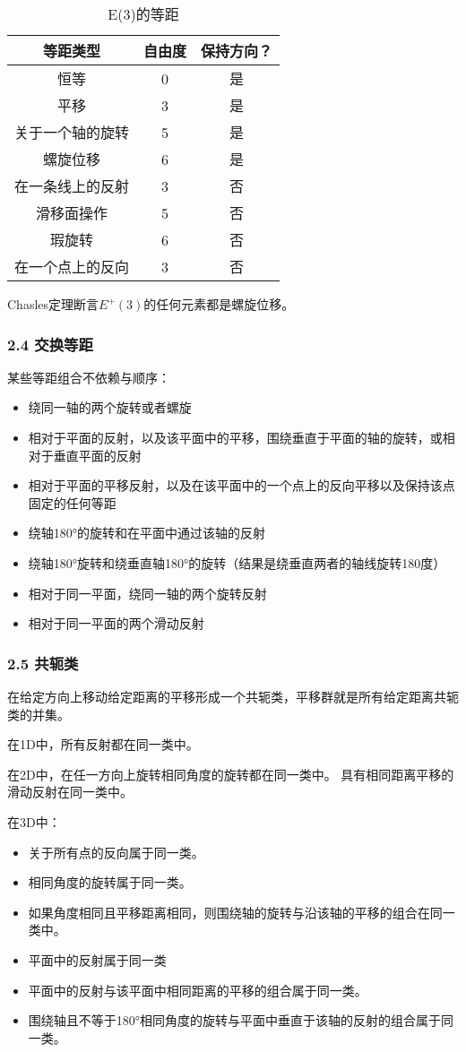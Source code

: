 \begin{table}[ht]
\centering
\caption{E(3)的等距}\label{tab_OJLDQ_2}
\begin{tabular}{|c|c|c}
\hline
\textbf{等距类型} & \textbf{自由度} & \textbf{保持方向？} \\
\hline
恒等 & 0 & 是 \\
\hline
平移 & 3 & 是\\
\hline
关于一个轴的旋转 & 5 & 是 \\
\hline
螺旋位移 & 6 & 是 \\
\hline
在一条线上的反射 & 3 & 否 \\
\hline
滑移面操作 & 5 & 否 \\
\hline
瑕旋转 & 6 & 否 \\
\hline
在一个点上的反向 & 3 & 否 \\
\hline
\end{tabular}
\end{table}

Chasles定理断言$E^+(3)$的任何元素都是螺旋位移。

\subsubsection{2.4 交换等距}

某些等距组合不依赖与顺序：

\begin{itemize}
\item 绕同一轴的两个旋转或者螺旋
\item 相对于平面的反射，以及该平面中的平移，围绕垂直于平面的轴的旋转，或相对于垂直平面的反射
\item 相对于平面的平移反射，以及在该平面中的一个点上的反向平移以及保持该点固定的任何等距
\item 绕轴180°的旋转和在平面中通过该轴的反射
\item 绕轴180°旋转和绕垂直轴180°的旋转（结果是绕垂直两者的轴线旋转180度）
\item 相对于同一平面，绕同一轴的两个旋转反射
\item 相对于同一平面的两个滑动反射
\end{itemize}


\subsubsection{2.5 共轭类}

在给定方向上移动给定距离的平移形成一个共轭类，平移群就是所有给定距离共轭类的并集。

在1D中，所有反射都在同一类中。

在2D中，在任一方向上旋转相同角度的旋转都在同一类中。 具有相同距离平移的滑动反射在同一类中。

在3D中：

\begin{itemize}
\item 关于所有点的反向属于同一类。
\item 相同角度的旋转属于同一类。
\item 如果角度相同且平移距离相同，则围绕轴的旋转与沿该轴的平移的组合在同一类中。
\item 平面中的反射属于同一类
\item 平面中的反射与该平面中相同距离的平移的组合属于同一类。
\item 围绕轴且不等于180°相同角度的旋转与平面中垂直于该轴的反射的组合属于同一类。
\end{itemize}


